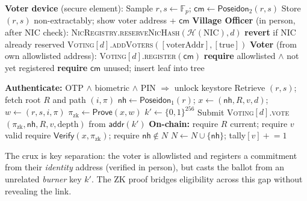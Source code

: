 \documentclass[conference]{IEEEtran}
\theoremstyle{definition}
\theoremstyle{plain}
\newcommand{\Poseidon}{\mathsf{Poseidon}}
\newcommand{\Hash}{\mathcal{H}}
\newcommand{\nullhash}{\mathsf{nh}}
\newcommand{\commit}{\mathsf{cm}}
\newcommand{\field}{\mathbb{F}_p}
\begin{document}
\begin{algorithm}[t]
\caption{Voter Enrollment (Village Officer + Voter)}
\label{alg:enroll}
\begin{algorithmic}[1]
\State \textbf{Voter device} (secure element):
\State \quad Sample $r,s\gets\field$; \; $\commit\gets\Poseidon_2(r,s)$
\State \quad Store $(r,s)$ non-extractably; show voter address + $\commit$
\State \textbf{Village Officer} (in person, after NIC check):
\State \quad \textsc{NicRegistry}.\textsc{reserveNicHash}$(\Hash(\text{NIC}),d)$
\State \qquad\textbf{revert} if NIC already reserved 
\State \quad \textsc{Voting}$[d]$.\textsc{addVoters}$([\text{voterAddr}],[\text{true}])$ 
\State \textbf{Voter} (from own allowlisted address):
\State \quad \textsc{Voting}$[d]$.\textsc{register}$(\commit)$
\State \qquad\textbf{require} allowlisted $\wedge$ not yet registered
\State \qquad\textbf{require} $\commit$ unused; \; insert leaf into tree
\end{algorithmic}
\end{algorithm}

\begin{algorithm}[t]
\caption{Anonymous Ballot Casting (Voter)}
\label{alg:vote}
\begin{algorithmic}[1]
\State \textbf{Authenticate:} OTP $\wedge$ biometric $\wedge$ PIN $\Rightarrow$ unlock keystore
\State Retrieve $(r,s)$; fetch root $R$ and path $(i,\pi)$
\State $\nullhash\gets\Poseidon_1(r)$;\; $x\gets(\nullhash,R,v,d)$;\; $w\gets(r,s,i,\pi)$
\State $\pi_{\text{zk}}\gets\mathsf{Prove}(x,w)$ 
\State $k'\gets\{0,1\}^{256}$ 
\State Submit \textsc{Voting}$[d]$.\textsc{vote}$(\pi_{\text{zk}},\nullhash,R,v,\text{depth})$ from $\mathsf{addr}(k')$
\State \textbf{On-chain:} require $R$ current; require $v$ valid
\State \qquad require $\mathsf{Verify}(x,\pi_{\text{zk}})$; require $\nullhash\notin N$
\State \qquad $N\gets N\cup\{\nullhash\}$; \; tally$[v]\mathrel{+}=1$
\end{algorithmic}
\end{algorithm}

The crux is key separation: the voter is allowlisted and registers a commitment from their \emph{identity} address (verified in person), but casts the ballot from an unrelated \emph{burner} key $k'$. The ZK proof bridges eligibility across this gap without revealing the link.

\end{document}
